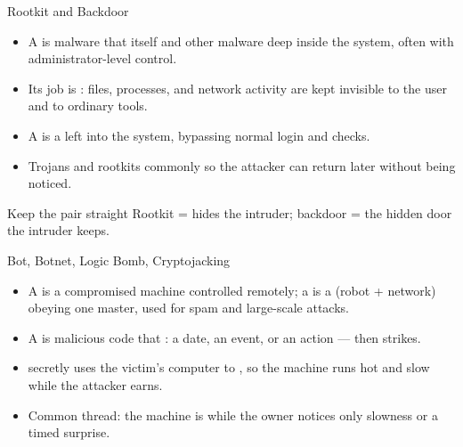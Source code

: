 \documentclass[aspectratio=169]{beamer}
\begin{document}
\begin{frame}{Rootkit and Backdoor}
  \begin{itemize}
    \item A  is malware that  itself and other
      malware deep inside the system, often with administrator-level control.
    \item Its job is : files, processes, and network
      activity are kept invisible to the user and to ordinary tools.
    \item A  is a  left into the
      system, bypassing normal login and checks.
    \item Trojans and rootkits commonly  so the
      attacker can return later without being noticed.
  \end{itemize}
  \begin{block}{Keep the pair straight}
    Rootkit = hides the intruder; backdoor = the hidden door the intruder
    keeps.
  \end{block}
\end{frame}

\begin{frame}{Bot, Botnet, Logic Bomb, Cryptojacking}
  \begin{itemize}
    \item A  is a compromised machine controlled remotely; a
       is a  (robot + network)
      obeying one master, used for spam and large-scale attacks.
    \item A  is malicious code that :
      a date, an event, or an action --- then strikes.
    \item {} secretly uses the victim's computer to
      , so the machine runs hot and slow while the
      attacker earns.
    \item Common thread: the machine is  while the owner notices
      only slowness or a timed surprise.
  \end{itemize}
\end{frame}
\end{document}
